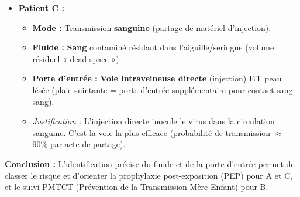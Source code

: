 \documentclass[11pt]{article}
\begin{document}
\begin{exoresolu}
\begin{itemize}
\begin{itemize}
        \item \textbf{Risque faible justifié :} La patiente est sous ARV avec \textbf{charge virale indétectable} ($< 50$ copies/mL). Le principe \textbf{TasP (Treatment as Prevention) / I=I (Indétectable = Intransmissible)} s'applique : le risque de transmission \emph{in utero} et \emph{per partum} est quasi nul ($< 1\%$). Cependant, le risque \textbf{post-partum par l'allaitement} persiste si l'allaitement est pratiqué (recommandation OMS/Cameroun : allaitement exclusif 6 mois \textbf{sous couverture ARV maternelle et prophylaxie infantile} pour réduire le risque à $< 1\%$).
    \end{itemize}
    \item \textbf{Patient C :}
    \begin{itemize}
        \item \textbf{Mode :} Transmission \textbf{sanguine} (partage de matériel d'injection).
        \item \textbf{Fluide :} \textbf{Sang} contaminé résidant dans l'aiguille/seringue (volume résiduel « dead space »).
        \item \textbf{Porte d'entrée :} \textbf{Voie intraveineuse directe} (injection) \textbf{ET} peau lésée (plaie suintante = porte d'entrée supplémentaire pour contact sang-sang).
        \item \textit{Justification :} L'injection directe inocule le virus dans la circulation sanguine. C'est la voie la plus efficace (probabilité de transmission $\approx$ 90\% par acte de partage).
    \end{itemize}
\end{itemize}
\textbf{Conclusion :} L'identification précise du fluide et de la porte d'entrée permet de classer le risque et d'orienter la prophylaxie post-exposition (PEP) pour A et C, et le suivi PMTCT (Prévention de la Transmission Mère-Enfant) pour B.
\end{exoresolu}
\end{document}
